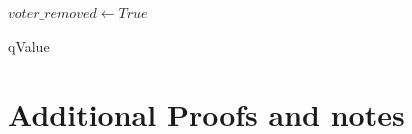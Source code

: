 \documentclass[runningheads]{llncs}
\begin{document}
\begin{subappendices}
\begin{algorithm}[h]
{{{            $voter\_removed \leftarrow True$
       }
       
     }
     
 }

 \caption{qValue}
\end{algorithm}


\section{Additional Proofs and notes}\label{app:proofs}



    




\end{subappendices}
\end{document}
